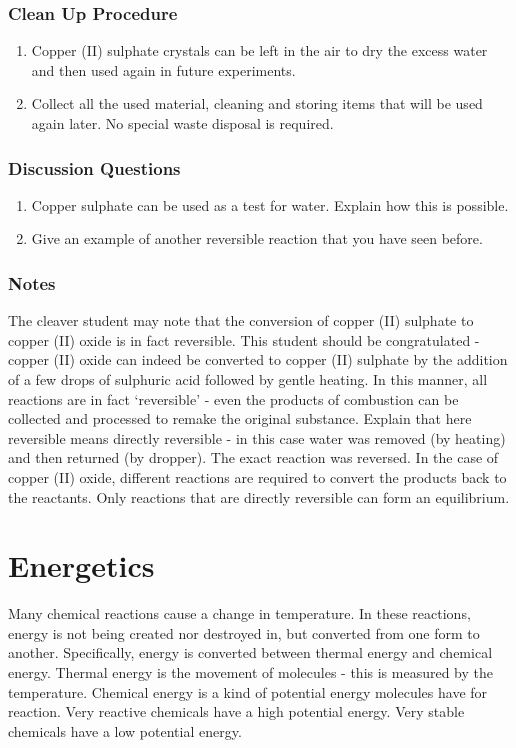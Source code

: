 \subsubsection*{Clean Up Procedure}
\begin{enumerate}
\item{Copper (II) sulphate crystals can be left in the air to dry the excess water and then used again in future experiments.}
\item{Collect all the used material, cleaning and storing items that will be used again later. No special waste disposal is required.}
\end{enumerate}

\subsubsection*{Discussion Questions}
\begin{enumerate}
\item{Copper sulphate can be used as a test for water. Explain how this is possible.}
\item{Give an example of another reversible reaction that you have seen before.}
\end{enumerate}

\subsubsection*{Notes}
The cleaver student may note that the conversion of copper (II) sulphate to copper (II) oxide is in fact reversible. This student should be congratulated - copper (II) oxide can indeed be converted to copper (II) sulphate by the addition of a few drops of sulphuric acid followed by gentle heating. In this manner, all reactions are in fact `reversible' - even the products of combustion can be collected and processed to remake the original substance. Explain that here reversible means directly reversible - in this case water was removed (by heating) and then returned (by dropper). The exact reaction was reversed. In the case of copper (II) oxide, different reactions are required to convert the products back to the reactants. Only reactions that are directly reversible can form an equilibrium.

\section{Energetics}

Many chemical reactions cause a change in temperature. In these reactions, energy is not being created nor destroyed in, but converted from one form to another. Specifically, energy is converted between thermal energy and chemical energy. Thermal energy is the movement of molecules - this is measured by the temperature. Chemical energy is a kind of potential energy molecules have for reaction. Very reactive chemicals have a high potential energy. Very stable chemicals have a low potential energy.

